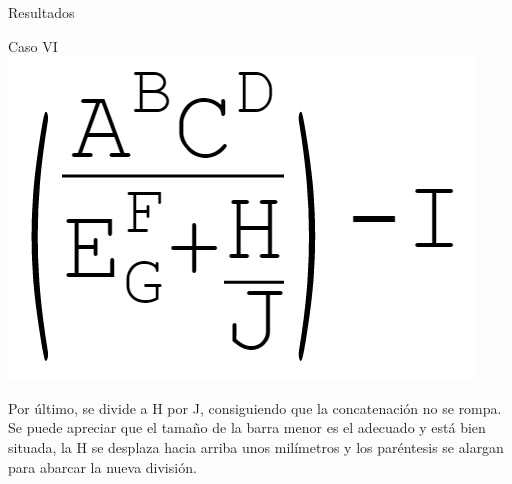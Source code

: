 \begin{section}{Resultados}
\begin{subsection}{Caso VI}
\includegraphics[scale=0.5]{./imgs/catedra2.png}

Por \'ultimo, se divide a H por J, consiguiendo que la concatenaci\'on no se rompa. Se puede apreciar que el tama\~no de la barra menor es el adecuado y est\'a bien situada, la H se desplaza hacia arriba unos mil\'imetros y los par\'entesis se alargan para abarcar la nueva divisi\'on. 

\end{subsection}
\end{section}
